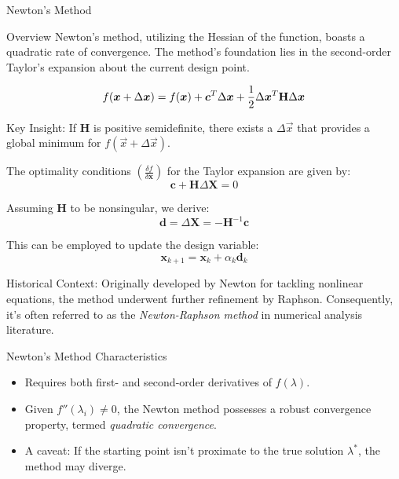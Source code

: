 \documentclass[
    NAME={Dr. Helga Ingimundardóttir},
    EMAIL={helgaingim@hi.is},
    FACULTY={Industrial Engineering},
    TITLE={Nonlinear Optimization},
    SUBTITLE={Approaches and Challenges},
    SEMINAR={VÉL113F},
    DATE={Design and Optimization}
]{../HI-latex/hi-beamer}
\begin{document}
    \begin{frame}{Newton's Method}
        \begin{block}{Overview}
            Newton's method, utilizing the Hessian of the function, boasts a quadratic rate of convergence.
            The method's foundation lies in the second-order Taylor’s expansion about the current design point.
        \end{block}

        \[
            f(\vec{x} + \Delta \vec{x}) = f(\vec{x}) + \vec{c}^T \Delta \vec{x} + \frac{1}{2} \Delta \vec{x}^T
            \mat{H} \Delta \vec{x}
        \]

        \alert{Key Insight}: If \( \mathbf{H} \) is positive semidefinite, there exists a \( \Delta \vec{x} \)
        that provides a global minimum for \( f(\vec{x} + \Delta \vec{x}) \).

        \framebreak

        The optimality conditions \(\left( \frac{\delta f}{\delta \mathbf{x}} \right)\) for the Taylor expansion
        are given by:
        \begin{equation}
            \mathbf{c} + \mathbf{H} \Delta \mathbf{X} = 0
        \end{equation}

        Assuming \(\mathbf{H}\) to be nonsingular, we derive:
        \begin{equation}
            \mathbf{d} = \Delta \mathbf{X} = -\mathbf{H}^{-1} \mathbf{c}
        \end{equation}

        This can be employed to update the design variable:
        \begin{equation}
            \mathbf{x}_{k+1} = \mathbf{x}_k + \alpha_k \mathbf{d}_k
        \end{equation}

        \framebreak
        \alert{Historical Context:}
        Originally developed by Newton for tackling nonlinear equations, the method underwent further refinement
        by Raphson. Consequently, it's often referred to as the \emph{Newton-Raphson method} in numerical
        analysis literature.

        \begin{block}{Newton's Method Characteristics}
            \begin{itemize}
                \item Requires both first- and second-order derivatives of \(f(\lambda)\).
                \item Given \(f''(\lambda_i) \neq 0\), the Newton method possesses a robust convergence property,
                termed \emph{quadratic convergence}.
                \item A caveat: If the starting point isn't proximate to the true solution \(\lambda^*\), the method
                may diverge.
            \end{itemize}
        \end{block}


\end{frame}
\end{document}
